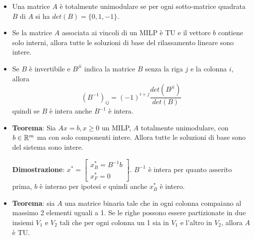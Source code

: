 \begin{itemize}
	\item Una matrice $A$ è totalmente unimodulare se per ogni sotto-matrice quadrata $B$ di $A$ si ha $det(B) = \{0, 1, -1\}$.
	\item Se la matrice $A$ associata ai vincoli di un MILP è TU e il vettore $b$ contiene solo interni, allora tutte le soluzioni di base del rilassamento lineare sono intere.
	\item Se $B$ è invertibile e $B^{ji}$ indica la matrice $B$ senza la riga $j$ e la colonna $i$, allora
	$$
	(B^{-1})_{ij} = (-1)^{i+j} \frac{det(B^{ji})}{det(B)}
	$$	
	quindi se $B$ è intera anche $B^{-1}$ è intera.
	\item \textbf{Teorema}: Sia $Ax = b, x\geq 0$ un MILP, $A$ totalmente unimodulare, con $b \in \mathbb{R}^m$ ma con solo componenti intere. Allora tutte le soluzioni di base sono del sistema sono intere. 
	
	\textbf{Dimostrazione}: $x^* = \begin{bmatrix} x_{B}^* = B^{-1}b \\
	x_{F}^* = 0
	\end{bmatrix}$. $B^{-1}$ è intera per quanto asserito prima, $b$ è interno per ipotesi e quindi anche $x_{B}^*$ è intero.
	
	\item \textbf{Teorema}: sia $A$ una matrice binaria tale che in ogni colonna compaiano al massimo 2 elementi uguali a 1. Se le righe possono essere partizionate in due insiemi $V_1$ e $V_2$ tali che per ogni colonna un 1 sia in $V_1$ e l'altro in $V_2$, allora $A$ è TU.
	

\end{itemize}
